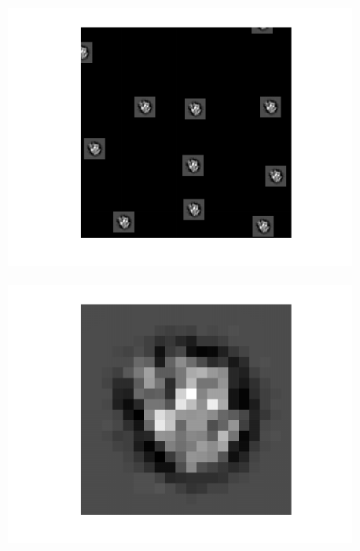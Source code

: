 \documentclass[english,11pt]{article}
\numberwithin{equation}{section}
\theoremstyle{plain}
\theoremstyle{definition}
\theoremstyle{remark}
\theoremstyle{plain}
\theoremstyle{remark}
\theoremstyle{plain}
\theoremstyle{plain}
\begin{document}
\begin{figure}

\advance\leftskip-2cm
\advance\rightskip -2cm

\begin{subfigure}{.6\textwidth}
	\centering
	\includegraphics[scale=0.6]{data2D_clean}
	\vspace*{-20pt}
\caption{}
\label{fig:data2D_clean}
	\end{subfigure}%
	\begin{subfigure}{.6\textwidth}
	\centering
	\includegraphics[scale=0.6]{signal2D_clean}
	\vspace*{-20pt}
	\caption{}
	\label{fig:signal2D_clean}
\end{subfigure}%



\end{figure}
\end{document}
